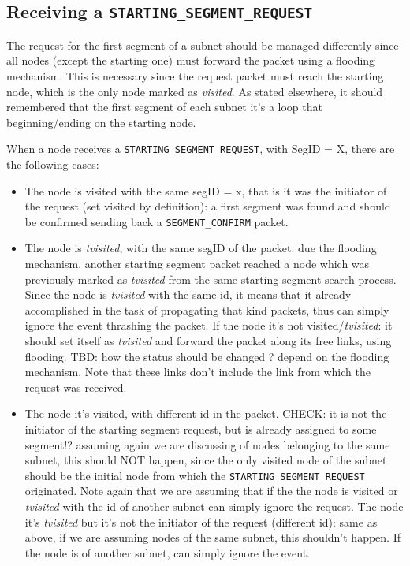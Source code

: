 \subsection{Receiving a \texttt{STARTING\_SEGMENT\_REQUEST}}

The request for the first segment of a
subnet should be managed differently since all nodes (except the starting
one) must forward the packet using a flooding mechanism. This is
necessary since the request packet must reach the starting node, which
is the only node marked as \emph{visited}. As stated elsewhere, it should
remembered that the first segment of each subnet it's  a loop that
beginning/ending on the starting node.

When a node receives a \texttt{STARTING\_SEGMENT\_REQUEST}, with SegID = X,  there
are the following cases:

\begin{itemize}
\item The node is visited with the same segID = x, that is it was the
initiator of the request (set visited by definition): a first segment
was found and should be confirmed sending back a \texttt{SEGMENT\_CONFIRM}
packet.  
\item The node is \emph{tvisited}, with the same segID of the packet: due
the flooding mechanism, another starting segment packet reached a node
which was previously marked as \emph{tvisited} from the same starting segment
search process. Since the node is \emph{tvisited} with the same id, it means
that it already accomplished in the task of propagating that kind
packets, thus can simply ignore the event thrashing the packet.  If
the node it's not visited/\emph{tvisited}: it should set itself as \emph{tvisited}
and forward the packet along its free links, using flooding. TBD: how
the status should be changed ? depend on the flooding mechanism. Note
that these links don’t include the link from which the request was
received.  
\item The node it's visited, with different id in the packet.
CHECK:  it is not the initiator of the starting segment request, but
is already assigned to some segment!? assuming again we are discussing
of nodes belonging to the same subnet, this should NOT happen, since
the only visited node of the subnet should be the initial node from
which the \texttt{STARTING\_SEGMENT\_REQUEST} originated. Note again that we are
assuming that if the the node is visited or \emph{tvisited} with the id of
another subnet can simply ignore the request.  The node it's \emph{tvisited}
but it's not the initiator of the request (different id): same as
above, if we are assuming nodes of the same subnet, this shouldn’t
happen. If the node is of another subnet, can simply ignore the event.

\end{itemize}


